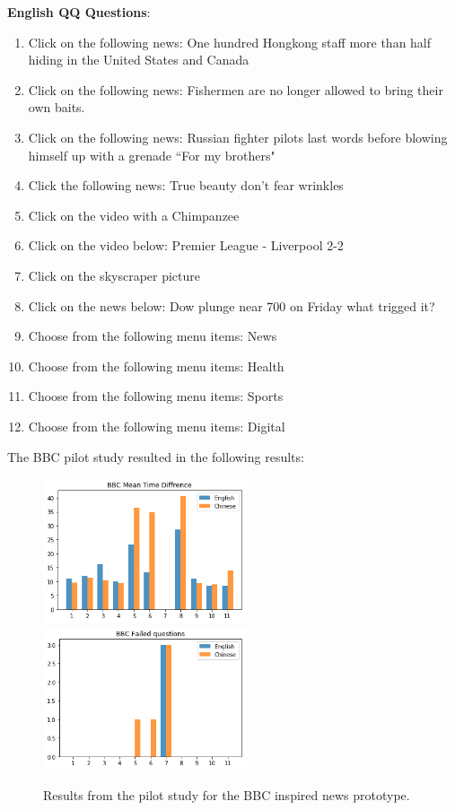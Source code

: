 \textbf{English QQ Questions}:
\begin{enumerate}

	
	\item Click on the following news: One hundred Hongkong staff more than half hiding in the United States and Canada
	
	\item Click on the following news: Fishermen are no longer allowed to bring their own baits.
	
	\item Click on the following news: Russian fighter pilots last words before blowing himself up with a grenade “For my brothers"
		
	\item Click the following news: True beauty don’t fear wrinkles
		
	\item Click on the video with a Chimpanzee
	
	\item Click on the video below: Premier League - Liverpool 2-2
		
	\item Click on the skyscraper picture
		
	\item Click on the news below: Dow plunge near 700 on Friday what trigged it?
		
	\item Choose from the following menu items: News
		
	\item Choose from the following menu items: Health
		
	\item Choose from the following menu items: Sports
	
	\item Choose from the following menu items: Digital
\end{enumerate}
The BBC pilot study resulted in the following results: 
\begin{figure}[h]
	\centering
	\includegraphics[width=60mm]{Images/pilot_study_bbc_mean_time}
	\includegraphics[width=60mm]{Images/pilot_study_bbc_failed}
	\decoRule
		\caption[BBC pilot study results]{Results from the pilot study for the BBC inspired news prototype.}
	\label{fig:pilot_study_bbc}
\end{figure}

